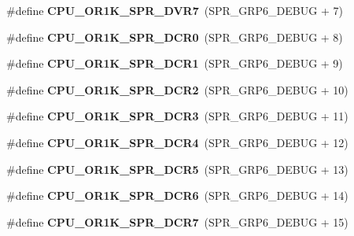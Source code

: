 \begin{DoxyCompactItemize}
\item 
\mbox{\label{or1k-utility_8h_a42fa80d5ea8de3951fc3fb436774affe}} 
\#define {\bfseries C\+P\+U\+\_\+\+O\+R1\+K\+\_\+\+S\+P\+R\+\_\+\+D\+V\+R7}~(S\+P\+R\+\_\+\+G\+R\+P6\+\_\+\+D\+E\+B\+UG + 7)
\item 
\mbox{\label{or1k-utility_8h_ade058fe16cf3def0064e32e2bcef8838}} 
\#define {\bfseries C\+P\+U\+\_\+\+O\+R1\+K\+\_\+\+S\+P\+R\+\_\+\+D\+C\+R0}~(S\+P\+R\+\_\+\+G\+R\+P6\+\_\+\+D\+E\+B\+UG + 8)
\item 
\mbox{\label{or1k-utility_8h_afc52a4f2456773b98e510414130bef85}} 
\#define {\bfseries C\+P\+U\+\_\+\+O\+R1\+K\+\_\+\+S\+P\+R\+\_\+\+D\+C\+R1}~(S\+P\+R\+\_\+\+G\+R\+P6\+\_\+\+D\+E\+B\+UG + 9)
\item 
\mbox{\label{or1k-utility_8h_aa98586810fc3dab2db0c0a829e83f9b0}} 
\#define {\bfseries C\+P\+U\+\_\+\+O\+R1\+K\+\_\+\+S\+P\+R\+\_\+\+D\+C\+R2}~(S\+P\+R\+\_\+\+G\+R\+P6\+\_\+\+D\+E\+B\+UG + 10)
\item 
\mbox{\label{or1k-utility_8h_a17cd5ae7dea21b72d0dd173e82293add}} 
\#define {\bfseries C\+P\+U\+\_\+\+O\+R1\+K\+\_\+\+S\+P\+R\+\_\+\+D\+C\+R3}~(S\+P\+R\+\_\+\+G\+R\+P6\+\_\+\+D\+E\+B\+UG + 11)
\item 
\mbox{\label{or1k-utility_8h_a3e0d3d73dde2745ea17cd5efbaa0f0b5}} 
\#define {\bfseries C\+P\+U\+\_\+\+O\+R1\+K\+\_\+\+S\+P\+R\+\_\+\+D\+C\+R4}~(S\+P\+R\+\_\+\+G\+R\+P6\+\_\+\+D\+E\+B\+UG + 12)
\item 
\mbox{\label{or1k-utility_8h_a28c4bf881dc876f48f6efa75181962e9}} 
\#define {\bfseries C\+P\+U\+\_\+\+O\+R1\+K\+\_\+\+S\+P\+R\+\_\+\+D\+C\+R5}~(S\+P\+R\+\_\+\+G\+R\+P6\+\_\+\+D\+E\+B\+UG + 13)
\item 
\mbox{\label{or1k-utility_8h_ae5931ad6c257b5a976c4d74d21200bc0}} 
\#define {\bfseries C\+P\+U\+\_\+\+O\+R1\+K\+\_\+\+S\+P\+R\+\_\+\+D\+C\+R6}~(S\+P\+R\+\_\+\+G\+R\+P6\+\_\+\+D\+E\+B\+UG + 14)
\item 
\mbox{\label{or1k-utility_8h_aeec2c741b24d029c27332b03f8744418}} 
\#define {\bfseries C\+P\+U\+\_\+\+O\+R1\+K\+\_\+\+S\+P\+R\+\_\+\+D\+C\+R7}~(S\+P\+R\+\_\+\+G\+R\+P6\+\_\+\+D\+E\+B\+UG + 15)

\end{DoxyCompactItemize}
